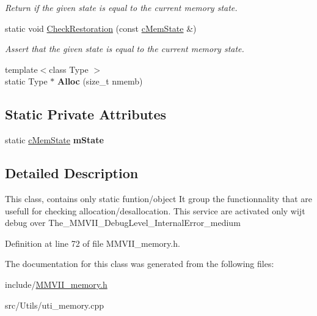 \begin{DoxyCompactItemize}
\begin{DoxyCompactList}\small\item\em Return if the given state is equal to the current memory state. \end{DoxyCompactList}\item 
static void \hyperlink{classMMVII_1_1cMemManager_aebff95dff7b7a5a5a46c1e374167ea01}{Check\+Restoration} (const \hyperlink{classMMVII_1_1cMemState}{c\+Mem\+State} \&)\hypertarget{classMMVII_1_1cMemManager_aebff95dff7b7a5a5a46c1e374167ea01}{}\label{classMMVII_1_1cMemManager_aebff95dff7b7a5a5a46c1e374167ea01}

\begin{DoxyCompactList}\small\item\em Assert that the given state is equal to the current memory state. \end{DoxyCompactList}\item 
{\footnotesize template$<$class Type $>$ }\\static Type $\ast$ {\bfseries Alloc} (size\+\_\+t nmemb)\hypertarget{classMMVII_1_1cMemManager_a32b175b2714f80ab04d4c32c8957eb12}{}\label{classMMVII_1_1cMemManager_a32b175b2714f80ab04d4c32c8957eb12}

\end{DoxyCompactItemize}
\subsection*{Static Private Attributes}
\begin{DoxyCompactItemize}
\item 
static \hyperlink{classMMVII_1_1cMemState}{c\+Mem\+State} {\bfseries m\+State}\hypertarget{classMMVII_1_1cMemManager_a06ae9c04568134fe0632f289d86eead8}{}\label{classMMVII_1_1cMemManager_a06ae9c04568134fe0632f289d86eead8}

\end{DoxyCompactItemize}


\subsection{Detailed Description}
This class, contains only static funtion/object It group the functionnality that are usefull for checking allocation/desallocation. This service are activated only wijt debug over The\+\_\+\+M\+M\+V\+I\+I\+\_\+\+Debug\+Level\+\_\+\+Internal\+Error\+\_\+medium 

Definition at line 72 of file M\+M\+V\+I\+I\+\_\+memory.\+h.



The documentation for this class was generated from the following files\+:\begin{DoxyCompactItemize}
\item 
include/\hyperlink{MMVII__memory_8h}{M\+M\+V\+I\+I\+\_\+memory.\+h}\item 
src/\+Utils/uti\+\_\+memory.\+cpp\end{DoxyCompactItemize}
